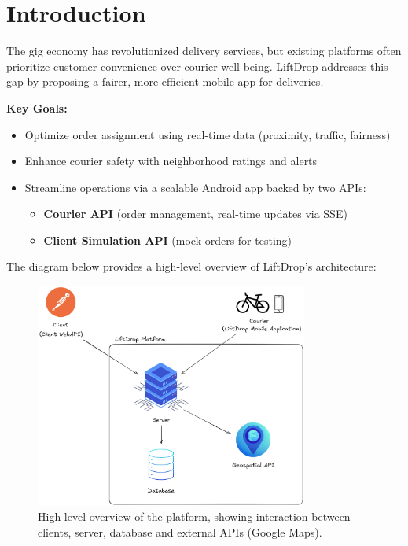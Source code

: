 \section{Introduction}
The gig economy has revolutionized delivery services, but existing platforms often prioritize customer convenience over courier well-being. LiftDrop addresses this gap by proposing a fairer, more efficient mobile app for deliveries.

\vspace{3mm}

\textbf{Key Goals:}

\begin{itemize}
    \item Optimize order assignment using real-time data (proximity, traffic, fairness)
    \item Enhance courier safety with neighborhood ratings and alerts
    \item Streamline operations via a scalable Android app backed by two APIs:
    \begin{itemize}
        \item \textbf{Courier API} (order management, real-time updates via SSE)
        \item \textbf{Client Simulation API} (mock orders for testing)
    \end{itemize}
\end{itemize}

\vspace{5mm}

The diagram below provides a high-level overview of LiftDrop's architecture:

\vspace{3mm}

\begin{figure}[h]
    \centering
    \includegraphics[width=0.8\textwidth]{images/LiftDrop_High_level_view.png}
    \caption{High-level overview of the platform, showing interaction between clients, server, database and external APIs (Google Maps).}
    \label{fig:high_level}
\end{figure}
